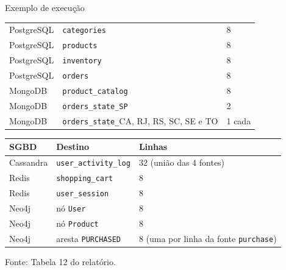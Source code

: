 \begin{frame}[fragile]{Exemplo de execução}
\begin{minipage}[t]{0.49\textwidth}
\begin{tabular}[t]{@{}l E{37mm} E{13mm}@{}}
      \midrule
      PostgreSQL & \texttt{categories}         & 8 \\
      PostgreSQL & \texttt{products}           & 8 \\
      PostgreSQL & \texttt{inventory}          & 8 \\
      PostgreSQL & \texttt{orders}             & 8 \\
      MongoDB    & \texttt{product\_catalog}   & 8 \\
      MongoDB    & \texttt{orders\_state\_SP}  & 2 \\
      MongoDB    & \texttt{orders\_state\_}CA, RJ, RS, SC, SE e TO & 1 cada \\
      \bottomrule
    \end{tabular}
  \end{minipage}\hfill
  \begin{minipage}[t]{0.49\textwidth}
    \begin{tabular}[t]{@{}l l E{27mm}@{}}
      \toprule
      \bfseries SGBD & \bfseries Destino & \bfseries Linhas \\
      \midrule
      Cassandra & \texttt{user\_activity\_log} & 32 (união das 4 fontes) \\
      Redis & \texttt{shopping\_cart}     & 8 \\
      Redis & \texttt{user\_session}      & 8 \\
      Neo4j & nó \texttt{User}            & 8 \\
      Neo4j & nó \texttt{Product}         & 8 \\
      Neo4j & aresta \texttt{PURCHASED}   & 8 (uma por linha da fonte \texttt{purchase}) \\
      \bottomrule
    \end{tabular}
  \end{minipage}\par
  {\scriptsize\color{black!60}Fonte: Tabela 12 do relatório.\par}
\end{frame}


